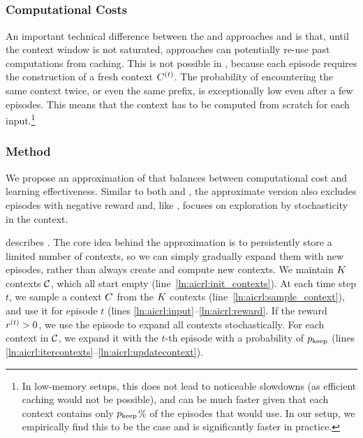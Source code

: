 \subsection{\approximate}\label{sec:icrl:approximate}

\subsubsection{\explorative Computational Costs}


An important technical difference between the \naiveshort and \naiveplusshort approaches and \expshort is that, until the context window is not saturated, \naiveshort approaches can potentially re-use past computations from caching. This is not possible in \expshort, because each episode requires the construction of a fresh context $C^{(t)}$. The probability of encountering the same context twice, or even the same prefix, is exceptionally low even after a few episodes. 
This means that the context has to be computed from scratch for each input.\footnote{In low-memory setups, this does not lead to noticeable slowdowns (as efficient caching would not be possible), and \expshort can be much faster given that each context contains only $p_\text{keep}$\% of the episodes that \naiveplusshort would use. In our setup, we empirically find this to be the case and \expshort is significantly faster in practice.}



\subsubsection{Method}
We propose an approximation of \explorative that balances between computational cost and learning effectiveness. 
Similar to both \naiveplusshort and \expshort, the approximate version also excludes episodes with negative reward and, like \expshort, focuses on exploration by stochasticity in the context. 

 describes \approximate. 
The core idea behind the approximation is to persistently store a limited number of contexts, so we can simply gradually expand them with new episodes, rather than always create and compute new contexts. 
We maintain $K$ contexts $\mathcal{C}$, which all start empty (line~\ref{ln:aicrl:init_contexts}). 
At each time step $t$, we sample a context $C$ from the $K$ contexts (line~\ref{ln:aicrl:sample_context}), and use it for episode $t$ (lines \ref{ln:aicrl:input}--\ref{ln:aicrl:reward}. 
If the reward $r^{(t)}>0$, we use the episode to expand all contexts stochastically. 
For each context in $\mathcal{C}$, we expand it with the $t$-th episode with a probability of $p_\text{keep}$ (lines \ref{ln:aicrl:itercontexts}--\ref{ln:aicrl:updatecontext}). 

